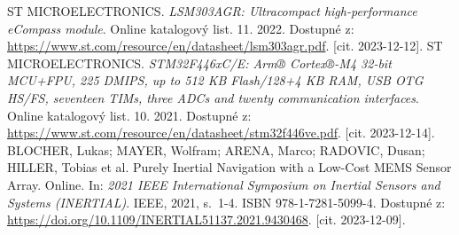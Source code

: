 \begin{thebibliography}{22}
ST MICROELECTRONICS. \textit{LSM303AGR: Ultracompact high-performance eCompass module}. Online katalogový list. 11. 2022. Dostupné z: \url{https://www.st.com/resource/en/datasheet/lsm303agr.pdf}. [cit. 2023-12-12].
ST MICROELECTRONICS. \textit{STM32F446xC/E: Arm® Cortex®-M4 32-bit MCU+FPU, 225 DMIPS, up to 512 KB Flash/128+4 KB RAM, USB OTG HS/FS, seventeen TIMs, three ADCs and twenty communication interfaces}. Online katalogový list. 10. 2021. Dostupné z: \url{https://www.st.com/resource/en/datasheet/stm32f446ve.pdf}. [cit. 2023-12-14].
BLOCHER, Lukas; MAYER, Wolfram; ARENA, Marco; RADOVIC, Dusan; HILLER, Tobias et al. Purely Inertial Navigation with a Low-Cost MEMS Sensor Array. Online. In: \textit{2021 IEEE International Symposium on Inertial Sensors and Systems (INERTIAL)}. IEEE, 2021, s.~1-4. ISBN 978-1-7281-5099-4. Dostupné z: \url{https://doi.org/10.1109/INERTIAL51137.2021.9430468}. [cit. 2023-12-09].
\end{thebibliography}